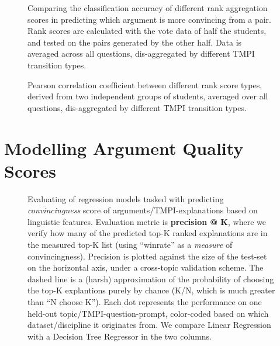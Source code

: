 \documentclass[notitlepage,12pt]{jedm}
\begin{document}
\begin{figure}
	\scalebox{0.6}{}
	\caption{
		Comparing the classification accuracy of different rank aggregation 
		scores in predicting which argument is more convincing from a pair. 
		Rank scores are calculated with the vote data of half the students, and 
		tested on the pairs generated by the other half. 
		Data is averaged across all questions, dis-aggregated by different TMPI 
		transition types. 
	}
	\label{fig:acc_by_rank_score_type}
\end{figure}

\begin{figure}
	\scalebox{0.6}{}
	\caption{
		Pearson correlation coefficient between different rank score types, 
		derived from two independent groups of students, averaged over all 
		questions, dis-aggregated by different TMPI transition types.
	}
	\label{fig:acc_by_rank_score_type}
\end{figure}






\section{Modelling Argument Quality Scores}\label{sec:model}

\begin{figure}
	\scalebox{0.5}{}
	\caption{
		Evaluating of regression models tasked with predicting 
		\textit{convincingness} score of arguments/TMPI-explanations based on 
		linguistic features.
		Evaluation metric is \textbf{precision @ K}, where we verify how many 
		of the predicted top-K ranked explanations are in the measured top-K 
		list (using ``winrate'' as a \textit{measure} of convincingness). 
		Precision is plotted against the size of the test-set on the horizontal 
		axis, under a cross-topic validation scheme.
		The dashed line is a (harsh) approximation of the probability of 
		choosing the top-K explantions purely by chance (K/N, which is much 
		greater than ``N choose K'').
		Each dot represents the performance on one held-out 
		topic/TMPI-question-prompt, color-coded based on which 
		dataset/discipline it originates from.
		We compare Linear Regression with a Decision Tree Regressor in the two 
		columns.
	}
	\label{fig:prec_at_K}
\end{figure}
\end{document}

